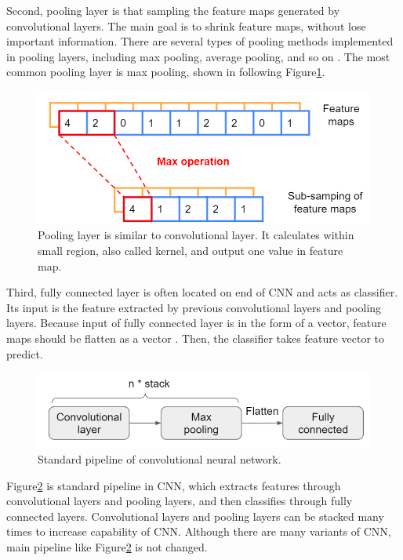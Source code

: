 Second, pooling layer is that sampling the feature maps generated by convolutional layers. The main goal is to shrink feature maps, without lose important information. There are several types of pooling methods implemented in pooling layers, including max pooling, average pooling, and so on \cite{alzubaidi2021review}. The most common pooling layer is max pooling, shown in following Figure\ref{f5}.

\begin{figure}[H]
    \centering
    \includegraphics[width=0.9\columnwidth]{body/figure/figure5.png}
    \captionsetup{labelfont=bf}
    \renewcommand{\baselinestretch}{1.0}
    \caption[Operation of max pooling]{Pooling layer is similar to convolutional layer. It calculates within small region, also called kernel, and output one value in feature map.}
    \label{f5}
\end{figure}

Third, fully connected layer is often located on end of CNN and acts as classifier. Its input is the feature extracted by previous convolutional layers and pooling layers. Because input of fully connected layer is in the form of a vector, feature maps should be flatten as a vector \cite{alzubaidi2021review}. Then, the classifier takes feature vector to predict.

\begin{figure}[H]
    \centering
    \includegraphics[width=0.9\columnwidth]{body/figure/figure6.png}
    \captionsetup{labelfont=bf}
    \renewcommand{\baselinestretch}{1.0}
    \caption[Standard pipeline of convolutional neural network]{Standard pipeline of convolutional neural network.}
    \label{f6}
\end{figure}

Figure\ref{f6} is standard pipeline in CNN, which extracts features through convolutional layers and pooling layers, and then classifies through fully connected layers. Convolutional layers and pooling layers can be stacked many times to increase capability of CNN. Although there are many variants of CNN, main pipeline like Figure\ref{f6} is not changed.

